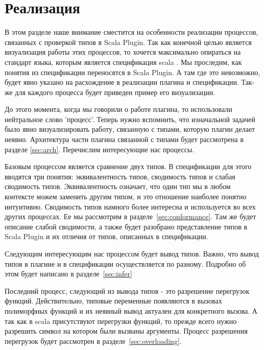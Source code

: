 \section{Реализация}
\label{sec:implementation}

В этом разделе наше внимание сместится на особенности реализации процессов,
связанных с проверкой типов в Scala Plugin.
Так как конечной целью является визуализация работы этих процессов, то
хочется максимально опираться на стандарт языка, которым является спецификация
scala \cite{scala_spec}.
Мы проследим, как понятия из спецификации переносятся в Scala Plugin.
А там где это невозможно, будет явно указано на расхождение в реализации плагина и
спецификации.
Так-же для каждого процесса будет приведен пример его визуализации.


До этого момента, когда мы говорили о работе плагина, то использовали
нейтральное слово 'процесс'.
Теперь нужно вспомнить, что изначальной задачей было явно визуализировать
работу, связанную с типами, которую плагин делает неявно.
Архитектура части плагина связанной с типами будет
рассмотрена в разделе \ref{sec:arch}.
Перечислим интересующие нас процессы.

Базовым процессом является сравнение двух типов.
В спецификации для этого вводятся три понятия: эквивалентность типов, сводимость
типов и слабая сводимость типов.
Эквивалентность означает, что один тип мы в любом контексте можем заменить другим
типом, и это отношение наиболее понятно интуитивно.
Сводимость типов намного более интересна и используется во всех других процессах.
Ее мы рассмотрим в разделе~\ref{sec:conformance}.
Там же будет описание слабой сводимости, а также будет разобрано представление
типов в Scala Plugin и их отличия от типов, описанных в спецификации.

Следующим интересующим нас процессом будет вывод типов.
Важно, что вывод типов в плагине и в спецификации осуществляется по разному.
Подробно об этом будет написано в разделе~\ref{sec:infer}

Последний процесс, следующий из вывода типов - это разрешение перегрузок функций.
Действительно, типовые переменные появляются в вызовах полиморфных
функций и их неявный вывод актуален для конкретного вызова.
А так как в scala присутствуют перегрузки функций, то прежде всего нужно
разрешить символ на котором были вызваны аргументы.
Процесс разрешения перегрузок будет рассмотрен в разделе~\ref{sec:overloading}.

